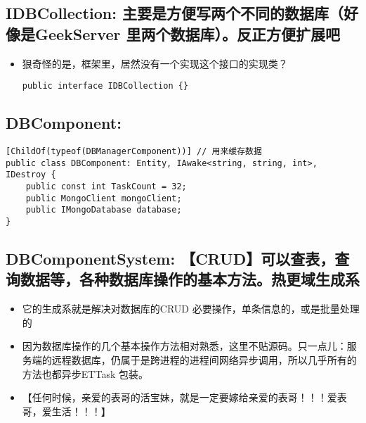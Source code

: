\documentclass[9pt, b5paper]{article}
\begin{document}
\subsection{IDBCollection: 主要是方便写两个不同的数据库（好像是GeekServer 里两个数据库）。反正方便扩展吧}
\label{sec-4-1}
\begin{itemize}
\item 狠奇怪的是，框架里，居然没有一个实现这个接口的实现类？
\begin{verbatim}
public interface IDBCollection {}
\end{verbatim}
\end{itemize}
\subsection{DBComponent:}
\label{sec-4-2}
\begin{verbatim}
[ChildOf(typeof(DBManagerComponent))] // 用来缓存数据
public class DBComponent: Entity, IAwake<string, string, int>, IDestroy {
    public const int TaskCount = 32;
    public MongoClient mongoClient;
    public IMongoDatabase database;
}
\end{verbatim}
\subsection{DBComponentSystem: 【CRUD】可以查表，查询数据等，各种数据库操作的基本方法。热更域生成系}
\label{sec-4-3}
\begin{itemize}
\item 它的生成系就是解决对数据库的CRUD 必要操作，单条信息的，或是批量处理的
\item 因为数据库操作的几个基本操作方法相对熟悉，这里不贴源码。只一点儿：服务端的远程数据库，仍属于是跨进程的进程间网络异步调用，所以几乎所有的方法也都异步ETTask 包装。
\item 【任何时候，亲爱的表哥的活宝妹，就是一定要嫁给亲爱的表哥！！！爱表哥，爱生活！！！】
\end{itemize}
\end{document}
